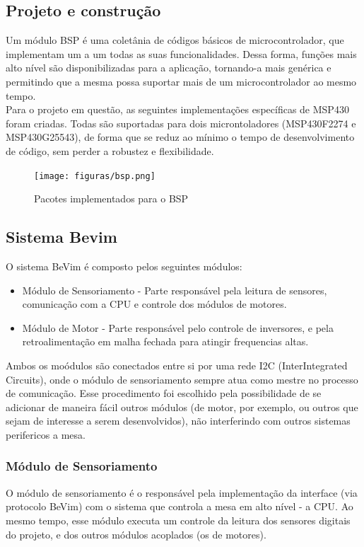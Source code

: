 \subsection{Projeto e construção}

Um módulo BSP é uma coletânia de códigos básicos de microcontrolador, que implementam um a um todas as suas funcionalidades. Dessa forma, funções mais alto nível são disponibilizadas para a aplicação, tornando-a mais genérica e permitindo que a mesma possa suportar mais de um microcontrolador ao mesmo tempo. \\
Para o projeto em questão, as seguintes implementações específicas de MSP430 foram criadas. Todas são suportadas para dois microntoladores (MSP430F2274 e MSP430G25543), de forma que se reduz ao mínimo o tempo de desenvolvimento de código, sem perder a robustez e flexibilidade.

\begin{figure}[htbp]
    \centering
        \texttt{[image: figuras/bsp.png]}
    \caption{Pacotes implementados para o BSP}
    \label{bsp-scheme}
\end{figure}

\subsection*{Sistema Bevim}

O sistema BeVim é composto pelos seguintes módulos:

\begin{itemize}
    \item Módulo de Sensoriamento - Parte responsável pela leitura de sensores, comunicação com a CPU e controle dos módulos de motores.
    \item Módulo de Motor - Parte responsável pelo controle de inversores, e pela retroalimentação em malha fechada para atingir frequencias altas.
\end{itemize}

Ambos os moódulos são conectados entre si por uma rede I2C (InterIntegrated Circuits), onde o módulo de sensoriamento sempre atua como mestre no processo de comunicação. Esse procedimento foi escolhido pela possibilidade de se adicionar de maneira fácil outros módulos (de motor, por exemplo, ou outros que sejam de interesse a serem desenvolvidos), não interferindo com outros sistemas perifericos a mesa.

\subsubsection*{Módulo de Sensoriamento}
O módulo de sensoriamento é o responsável pela implementação da interface (via protocolo BeVim) com o sistema que controla a mesa em alto nível - a CPU. Ao mesmo tempo, esse módulo executa um controle da leitura dos sensores digitais do projeto, e dos outros módulos acoplados (os de motores).

